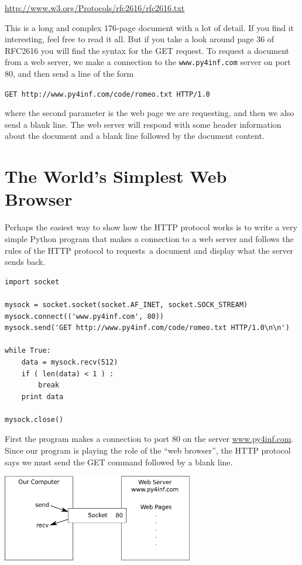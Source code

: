 \url{http://www.w3.org/Protocols/rfc2616/rfc2616.txt}

This is a long and complex 176-page document with a lot of detail.  If you 
find it interesting, feel free to read it all.  But if you take a look around page 36 of
RFC2616 you will find the syntax for the GET request.  To request a document from a web
server, we make a connection to the {\tt www.py4inf.com} server on port 80, and then
send a line of the form

{\tt GET http://www.py4inf.com/code/romeo.txt HTTP/1.0 }

where the second parameter is the web page we are requesting, and then 
we also send a blank line.  The web server will respond with some 
header information about the document and a blank line
followed by the document content.

\section{The World's Simplest Web Browser}

Perhaps the easiest way to show how the HTTP protocol works is to write a very 
simple Python program that makes a connection to a web server and follows
the rules of the HTTP protocol to requests\ a document 
and display what the server sends back.

\beforeverb
\begin{verbatim}
import socket

mysock = socket.socket(socket.AF_INET, socket.SOCK_STREAM)
mysock.connect(('www.py4inf.com', 80))
mysock.send('GET http://www.py4inf.com/code/romeo.txt HTTP/1.0\n\n')

while True:
    data = mysock.recv(512)
    if ( len(data) < 1 ) :
        break
    print data

mysock.close()
\end{verbatim}
\afterverb
%
First the program makes a connection to port 80 on 
the server \url{www.py4inf.com}.
Since our program is playing the role of the ``web browser'', the HTTP
protocol says we must send the GET command followed by a blank line.

\beforefig
\centerline{\includegraphics[height=1.50in]{figs2/socket.eps}}
\afterfig

